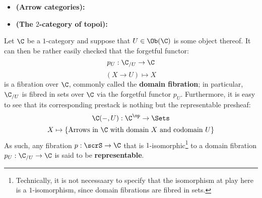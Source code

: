             \begin{example} \label{exmaple: abstract_fibrations}
                \noindent
                \begin{itemize}
                    \item \textbf{(Arrow categories):}
                    \item \textbf{(The $2$-category of topoi):}
                \end{itemize}
            \end{example}
            \begin{example} \label{example: slice_categories_and_representable_fibrations}
                Let $\C$ be a $1$-category and suppose that $U \in \Ob(\C)$ is some object thereof. It can then be rather easily checked that the forgetful functor:
                    $$p_U: \C_{/U} \to \C$$
                    $$(X \to U) \mapsto X$$
                is a fibration over $\C$, commonly called the \textbf{domain fibration}; in particular, $\C_{/U}$ is fibred in sets over $\C$ via the forgetful functor $p_U$. Furthermore, it is easy to see that its corresponding prestack is nothing but the representable presheaf:
                    $$\C(-, U): \C^{\op} \to \Sets$$
                    $$X \mapsto \{\text{Arrows in $\C$ with domain $X$ and codomain $U$}\}$$
                As such, any fibration $p: \scrS \to \C$ that is $1$-isomorphic\footnote{Technically, it is not necessaary to specify that the isomorphism at play here is a $1$-isomorphism, since domain fibrations are fibred in sets.} to a domain fibration $p_U: \C_{/U} \to \C$ is said to be \textbf{representable}.
            \end{example}
            \begin{example} \label{example: fibred_categories_of_quasi_coherent_sheaves}
                
            \end{example}
            \begin{example} \label{example: fibred_categories_of_finite_etale_morphisms}
                
            \end{example}
